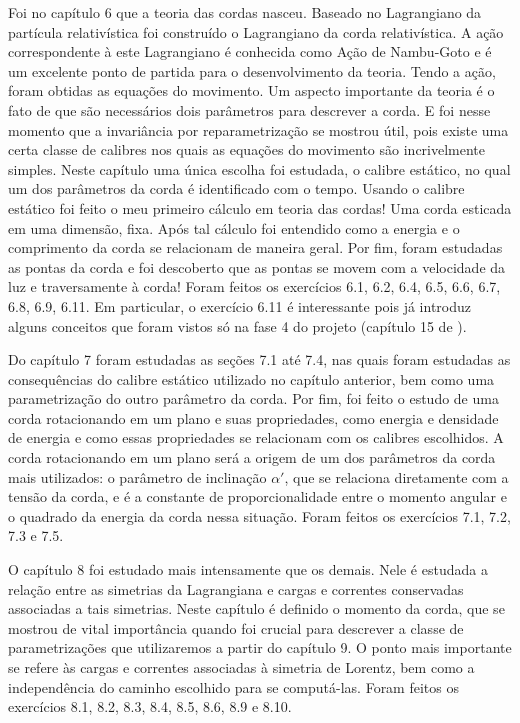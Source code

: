 \documentclass[oneside, 12pt]{article}
\begin{document}
Foi no capítulo 6 que a teoria das cordas nasceu. Baseado no Lagrangiano da partícula relativística foi construído o Lagrangiano da corda relativística. A ação correspondente à este Lagrangiano é conhecida como Ação de Nambu-Goto e é um excelente ponto de partida para o desenvolvimento da teoria. Tendo a ação, foram obtidas as equações do movimento. Um aspecto importante da teoria é o fato de que são necessários dois parâmetros para descrever a corda. E foi nesse momento que a invariância por reparametrização se mostrou útil, pois existe uma certa classe de calibres nos quais as equações do movimento são incrivelmente simples. Neste capítulo uma única escolha foi estudada, o calibre estático, no qual um dos parâmetros da corda é identificado com o tempo. Usando o calibre estático foi feito o meu primeiro cálculo em teoria das cordas! Uma corda esticada em uma dimensão, fixa. Após tal cálculo foi entendido como a energia e o comprimento da corda se relacionam de maneira geral. Por fim, foram estudadas as pontas da corda e foi descoberto que as pontas se movem com a velocidade da luz e traversamente à corda! Foram feitos os exercícios 6.1, 6.2, 6.4, 6.5, 6.6, 6.7, 6.8, 6.9, 6.11. Em particular, o exercício 6.11 é interessante pois já introduz alguns conceitos que foram vistos só na fase 4 do projeto (capítulo 15 de \cite{barton}).\par 

Do capítulo 7 foram estudadas as seções 7.1 até 7.4, nas quais foram estudadas as consequências do calibre estático utilizado no capítulo anterior, bem como uma parametrização do outro parâmetro da corda. Por fim, foi feito o estudo de uma corda rotacionando em um plano e suas propriedades, como energia e densidade de energia e como essas propriedades se relacionam com os calibres escolhidos. A corda rotacionando em um plano será a origem de um dos parâmetros da corda mais utilizados: o parâmetro de inclinação \(\alpha'\), que se relaciona diretamente com a tensão da corda, e é a constante de proporcionalidade entre o momento angular e o quadrado da energia da corda nessa situação. Foram feitos os exercícios 7.1, 7.2, 7.3 e 7.5.\par 

O capítulo 8 foi estudado mais intensamente que os demais. Nele é estudada a relação entre as simetrias da Lagrangiana e cargas e correntes conservadas associadas a tais simetrias. Neste capítulo é definido o momento da corda, que se mostrou de vital importância quando foi crucial para descrever a classe de parametrizações que utilizaremos a partir do capítulo 9. O ponto mais importante se refere às cargas e correntes associadas à simetria de Lorentz, bem como a independência do caminho escolhido para se computá-las. Foram feitos os exercícios 8.1, 8.2, 8.3, 8.4, 8.5, 8.6, 8.9 e 8.10.\par 
\end{document}
